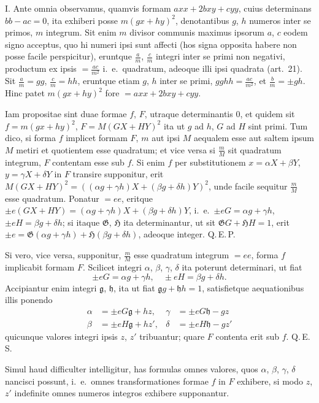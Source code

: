 \documentclass[12pt,a4paper]{article}
\theoremstyle{plain}
\theoremstyle{definition}
\theoremstyle{remark}
\begin{document}
I. Ante omnia observamus, quamvis formam $axx+2bxy+cyy$, cuius determinans $bb-ac=0$, ita exhiberi posse $m(gx+hy)^2$, denotantibus $g$, $h$ numeros inter se primos, $m$ integrum. Sit enim $m$ divisor communis maximus ipsorum $a$, $c$ eodem signo acceptus, quo hi numeri ipsi sunt affecti (hos signa opposita habere non posse facile perspicitur), eruntque $\frac{a}{m}$, $\frac{c}{m}$ integri inter se primi non negativi, productum ex ipsis $=\frac{ac}{m^2}$ i.\ e.\ quadratum, adeoque illi ipsi quadrata (art.\ 21). Sit $\frac{a}{m}=gg$, $\frac{c}{m}=hh$, eruntque etiam $g$, $h$ inter se primi, $gghh=\frac{ac}{m^2}$, et $\frac{b}{m}=\pm gh$. Hinc patet $m(gx+hy)^2$ fore $=axx+2bxy+cyy$.

Iam propositae sint duae formae $f$, $F$, utraque determinantis $0$, et quidem sit $f=m(gx+hy)^2$, $F=M(GX+HY)^2$ ita ut $g$ ad $h$, $G$ ad $H$ sint primi. Tum dico, si forma $f$ implicet formam $F$, $m$ aut ipsi $M$ aequalem esse aut saltem ipsum $M$ metiri et quotientem esse quadratum; et vice versa si $\frac{m}{M}$ sit quadratum integrum, $F$ contentam esse sub $f$. Si enim $f$ per substitutionem $x=\alpha X+\beta Y$, $y=\gamma X+\delta Y$ in $F$ transire supponitur, erit $M(GX+HY)^2 = ((\alpha g+\gamma h)X+(\beta g+\delta h)Y)^2$, unde facile sequitur $\frac{m}{M}$ esse quadratum. Ponatur $=ee$, eritque $\pm e(GX+HY) = (\alpha g+\gamma h)X+(\beta g+\delta h)Y$, i.\ e.\ $\pm eG = \alpha g+\gamma h$, $\pm eH = \beta g+\delta h$; si itaque $\mathfrak{G}$, $\mathfrak{H}$ ita determinantur, ut sit $\mathfrak{G}G+\mathfrak{H}H=1$, erit $\pm e = \mathfrak{G}(\alpha g+\gamma h)+\mathfrak{H}(\beta g+\delta h)$, adeoque integer. Q.\,E.\,P.

Si vero, vice versa, supponitur, $\frac{m}{M}$ esse quadratum integrum $=ee$, forma $f$ implicabit formam $F$. Scilicet integri $\alpha$, $\beta$, $\gamma$, $\delta$ ita poterunt determinari, ut fiat
\[
\pm eG = \alpha g+\gamma h,\quad \pm eH = \beta g+\delta h.
\]
Accipiantur enim integri $\mathfrak{g}$, $\mathfrak{h}$, ita ut fiat $\mathfrak{g}g+\mathfrak{h}h=1$, satisfietque aequationibus illis ponendo
\begin{align*}
\alpha &= \pm eG\mathfrak{g}+hz, & \gamma &= \pm eG\mathfrak{h}-gz \\
\beta &= \pm eH\mathfrak{g}+hz', & \delta &= \pm eH\mathfrak{h}-gz'
\end{align*}
quicunque valores integri ipsis $z$, $z'$ tribuantur; quare $F$ contenta erit sub $f$. Q.\,E.\,S.

Simul haud difficulter intelligitur, has formulas omnes valores, quos $\alpha$, $\beta$, $\gamma$, $\delta$ nancisci possunt, i.\ e.\ omnes transformationes formae $f$ in $F$ exhibere, si modo $z$, $z'$ indefinite omnes numeros integros exhibere supponantur.
\end{document}
